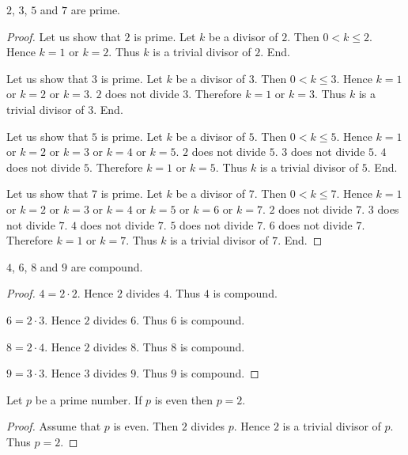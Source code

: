 \documentclass[../../arithmetic.ftl.tex]{subfiles}
\begin{document}
  \begin{forthel}
    \begin{proposition}\label{Arithmetic_03_04_175431}
      $2$, $3$, $5$ and $7$ are prime.
    \end{proposition}
    \begin{proof}
      Let us show that $2$ is prime.
        Let $k$ be a divisor of $2$.
        Then $0 < k \leq 2$.
        Hence $k = 1$ or $k = 2$.
        Thus $k$ is a trivial divisor of $2$.
      End.

      Let us show that $3$ is prime.
        Let $k$ be a divisor of $3$.
        Then $0 < k \leq 3$.
        Hence $k = 1$ or $k = 2$ or $k = 3$.
        $2$ does not divide $3$.
        Therefore $k = 1$ or $k = 3$.
        Thus $k$ is a trivial divisor of $3$.
      End.

      Let us show that $5$ is prime.
        Let $k$ be a divisor of $5$.
        Then $0 < k \leq 5$.
        Hence $k = 1$ or $k = 2$ or $k = 3$ or $k = 4$ or $k = 5$.
        $2$ does not divide $5$.
        $3$ does not divide $5$.
        $4$ does not divide $5$.
        Therefore $k = 1$ or $k = 5$.
        Thus $k$ is a trivial divisor of $5$.
      End.

      Let us show that $7$ is prime.
        Let $k$ be a divisor of $7$.
        Then $0 < k \leq 7$.
        Hence $k = 1$ or $k = 2$ or $k = 3$ or $k = 4$ or $k = 5$ or $k = 6$ or $k = 7$.
        $2$ does not divide $7$.
        $3$ does not divide $7$.
        $4$ does not divide $7$.
        $5$ does not divide $7$.
        $6$ does not divide $7$.
        Therefore $k = 1$ or $k = 7$.
        Thus $k$ is a trivial divisor of $7$.
      End.
    \end{proof}

    \begin{proposition}\label{Arithmetic_03_04_985728}
      $4$, $6$, $8$ and $9$ are compound.
    \end{proposition}
    \begin{proof}
      $4 = 2 \cdot 2$.
      Hence $2$ divides $4$.
      Thus $4$ is compound.

      $6 = 2 \cdot 3$.
      Hence $2$ divides $6$.
      Thus $6$ is compound.

      $8 = 2 \cdot 4$.
      Hence $2$ divides $8$.
      Thus $8$ is compound.

      $9 = 3 \cdot 3$.
      Hence $3$ divides $9$.
      Thus $9$ is compound.
    \end{proof}

    \begin{proposition}\label{Arithmetic_03_04_520376}
      Let $p$ be a prime number.
      If $p$ is even then $p = 2$.
    \end{proposition}
    \begin{proof}
      Assume that $p$ is even.
      Then $2$ divides $p$.
      Hence $2$ is a trivial divisor of $p$.
      Thus $p = 2$.
    \end{proof}
  \end{forthel}
\end{document}
